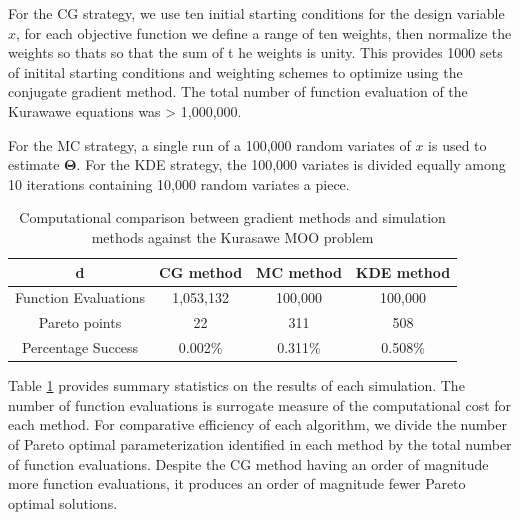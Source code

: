 For the CG strategy, we use ten initial starting conditions for the design variable $x$, for each objective function we define a range of ten weights, then normalize the weights so thats so that the sum of t he weights is unity.  This provides 1000 sets of initital starting conditions and weighting schemes to optimize using the conjugate gradient method.  The total number of function evaluation of the Kurawawe equations was > 1,000,000.

For the MC strategy, a single run of a 100,000 random variates of $x$  is used to estimate $\bm{\Theta}$.  For the KDE strategy, the 100,000 variates is divided equally among 10 iterations containing 10,000 random variates a piece.

\begin{table}[htbp]
	\caption{Computational comparison between gradient methods and simulation methods against the Kurasawe MOO problem}
	\label{tbl:kurasawe}
	\centering
	 \begin{tabular}{cccc}
		 \hline
		 d & CG method & MC method & KDE method \\
		 \hline
		 Function Evaluations & 1,053,132 & 100,000 & 100,000 \\
 		 Pareto points        & 22        & 311     & 508 \\
		 Percentage Success    & 0.002\%   & 0.311\% & 0.508\% \\
		 \hline
	 \end{tabular}
\end{table}

Table \ref{tbl:kurasawe} provides summary statistics on the results of each simulation.  The number of function evaluations is surrogate measure of the computational cost for each method.  For comparative efficiency of each algorithm, we divide the number of Pareto optimal parameterization identified in each method by the total number of function evaluations.  Despite the CG method having an order of magnitude more function evaluations, it produces an order of magnitude fewer Pareto optimal solutions.

